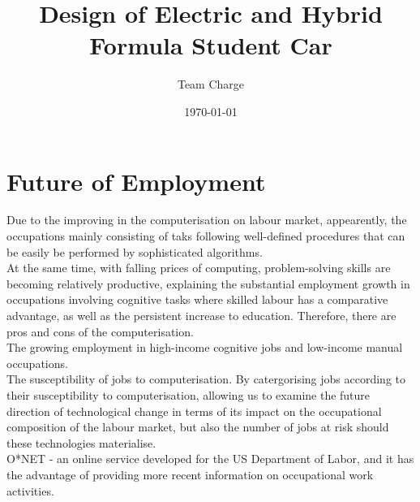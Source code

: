 \documentclass[11pt]{article}
\begin{document}
\doublespacing
{}

\title{Design of Electric and Hybrid Formula Student Car}
\author{Team Charge}
\date{\today}
\maketitle


\tableofcontents

\newpage


\thispagestyle{fancy} 
\clearpage

\section{Future of Employment}
   Due to the improving in the computerisation on labour market, appearently, the occupations mainly consisting of taks following well-defined procedures that can be easily be performed by sophisticated algorithms.\\

   At the same time, with falling prices of computing, problem-solving skills are becoming relatively productive, explaining the substantial employment growth in occupations involving cognitive tasks where skilled labour has a comparative advantage, as well as the persistent increase to education. Therefore, there are pros and cons of the computerisation.\\

   The growing employment in high-income cognitive jobs and low-income manual occupations.\\

   The susceptibility of jobs to computerisation. By catergorising jobs according to their susceptibility to computerisation, allowing us to examine the future direction of technological change in terms of its impact on the occupational composition of the labour market, but also the number of jobs at risk should these technologies materialise.\\

   O*NET - an online service developed for the US Department of Labor, and it has the advantage of providing more recent information on occupational work activities.\\
\end{document}
